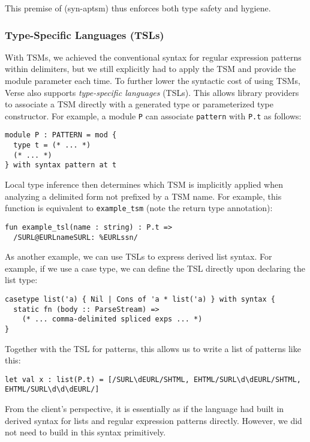 \begin{enumerate}
\begin{mathpar}
\end{mathpar}


This premise of (syn-aptsm) thus enforces both type safety and hygiene.

\end{enumerate}
\subsubsection{Type-Specific Languages (TSLs)}\label{sec:tsls}
With TSMs, we achieved the conventional syntax for regular expression patterns within delimiters, but we still explicitly had to apply the TSM and provide the module parameter each time. To further lower the syntactic cost of using TSMs, Verse also  supports \emph{type-specific languages} (TSLs). This allows library providers to associate a TSM directly with a generated type or parameterized type constructor. For example, a module \lstinline{P} can associate \lstinline{pattern} with \lstinline{P.t} as follows:
\begin{lstlisting}[numbers=none]
module P : PATTERN = mod {
  type t = (* ... *)
  (* ... *)
} with syntax pattern at t
\end{lstlisting}

 Local type inference then determines which TSM is implicitly applied when analyzing a delimited form not prefixed by a TSM name. For example, this function is equivalent to \lstinline{example_tsm} (note the return type annotation):
\begin{lstlisting}[numbers=none]
fun example_tsl(name : string) : P.t => 
  /SURL@EURLnameSURL: %EURLssn/
\end{lstlisting}

As another example, we can use TSLs to express derived list syntax. For example, if we use a case type, we can define the TSL directly upon declaring the list type:
\begin{lstlisting}[numbers=none]
casetype list('a) { Nil | Cons of 'a * list('a) } with syntax {
  static fn (body :: ParseStream) => 
    (* ... comma-delimited spliced exps ... *)
}
\end{lstlisting}
Together with the TSL for patterns, this allows us to write a list of patterns like this:
\begin{lstlisting}[numbers=none]
let val x : list(P.t) = [/SURL\dEURL/SHTML, EHTML/SURL\d\dEURL/SHTML, EHTML/SURL\d\d\dEURL/]
\end{lstlisting}
From the client's perspective, it is essentially as if the language had built in derived syntax for lists and regular expression patterns directly. However, we did not need to build in this syntax primitively.%

